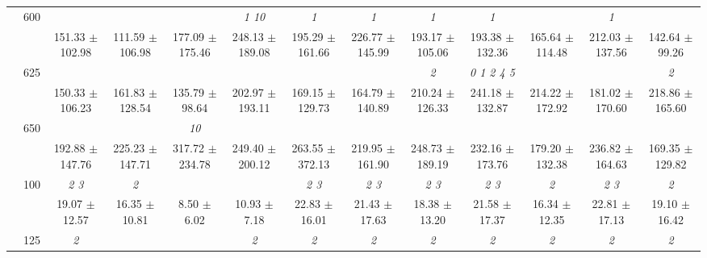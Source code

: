 \begin{table}[h]
{\begin{tabular}{
        ccccccccccccc}
 & \multirow{2}{*}{600}& & & & \textit{  1 10 }& \textit{ 1 }& \textit{ 1 }& \textit{ 1 }& \textit{ 1 }& & \textit{ 1 }&  \\ 
 & & 151.33 $\pm$ 102.98& 111.59 $\pm$ 106.98& 177.09 $\pm$ 175.46& 248.13 $\pm$ 189.08& 195.29 $\pm$ 161.66& 226.77 $\pm$ 145.99& 193.17 $\pm$ 105.06& 193.38 $\pm$ 132.36& 165.64 $\pm$ 114.48& 212.03 $\pm$ 137.56& 142.64 $\pm$ 99.26 \\ 
 & \multirow{2}{*}{625}& \cellcolor[HTML]{EFEFEF} & \cellcolor[HTML]{EFEFEF} & \cellcolor[HTML]{EFEFEF} & \cellcolor[HTML]{EFEFEF} & \cellcolor[HTML]{EFEFEF} & \cellcolor[HTML]{EFEFEF} & \cellcolor[HTML]{EFEFEF} \textit{ 2 }& \cellcolor[HTML]{EFEFEF} \textit{ 0 1 2 4 5 }& \cellcolor[HTML]{EFEFEF} & \cellcolor[HTML]{EFEFEF} & \cellcolor[HTML]{EFEFEF} \textit{ 2 } \\ 
 & & \cellcolor[HTML]{EFEFEF} 150.33 $\pm$ 106.23& \cellcolor[HTML]{EFEFEF} 161.83 $\pm$ 128.54& \cellcolor[HTML]{EFEFEF} 135.79 $\pm$ 98.64& \cellcolor[HTML]{EFEFEF} 202.97 $\pm$ 193.11& \cellcolor[HTML]{EFEFEF} 169.15 $\pm$ 129.73& \cellcolor[HTML]{EFEFEF} 164.79 $\pm$ 140.89& \cellcolor[HTML]{EFEFEF} 210.24 $\pm$ 126.33& \cellcolor[HTML]{EFEFEF} 241.18 $\pm$ 132.87& \cellcolor[HTML]{EFEFEF} 214.22 $\pm$ 172.92& \cellcolor[HTML]{EFEFEF} 181.02 $\pm$ 170.60& \cellcolor[HTML]{EFEFEF} 218.86 $\pm$ 165.60 \\ 
 & \multirow{2}{*}{650}& & & \textit{ 10 }& & & & & & & &  \\ 
 & & 192.88 $\pm$ 147.76& 225.23 $\pm$ 147.71& 317.72 $\pm$ 234.78& 249.40 $\pm$ 200.12& 263.55 $\pm$ 372.13& 219.95 $\pm$ 161.90& 248.73 $\pm$ 189.19& 232.16 $\pm$ 173.76& 179.20 $\pm$ 132.38& 236.82 $\pm$ 164.63& 169.35 $\pm$ 129.82 \\ \midrule 
 & \multirow{2}{*}{100}& \textit{ 2 3 }& \textit{ 2 }& & & \textit{ 2 3 }& \textit{ 2 3 }& \textit{ 2 3 }& \textit{ 2 3 }& \textit{ 2 }& \textit{ 2 3 }& \textit{ 2 } \\ 
 & & 19.07 $\pm$ 12.57& 16.35 $\pm$ 10.81& 8.50 $\pm$ 6.02& 10.93 $\pm$ 7.18& 22.83 $\pm$ 16.01& 21.43 $\pm$ 17.63& 18.38 $\pm$ 13.20& 21.58 $\pm$ 17.37& 16.34 $\pm$ 12.35& 22.81 $\pm$ 17.13& 19.10 $\pm$ 16.42 \\ 
 & \multirow{2}{*}{125}& \cellcolor[HTML]{EFEFEF} \textit{ 2 }& \cellcolor[HTML]{EFEFEF} & \cellcolor[HTML]{EFEFEF} & \cellcolor[HTML]{EFEFEF} \textit{ 2 }& \cellcolor[HTML]{EFEFEF} \textit{ 2 }& \cellcolor[HTML]{EFEFEF} \textit{ 2 }& \cellcolor[HTML]{EFEFEF} \textit{ 2 }& \cellcolor[HTML]{EFEFEF} \textit{ 2 }& \cellcolor[HTML]{EFEFEF} \textit{ 2 }& \cellcolor[HTML]{EFEFEF} \textit{ 2 }& \cellcolor[HTML]{EFEFEF} \textit{ 2 } \\ 

\end{tabular}}
\end{table}

